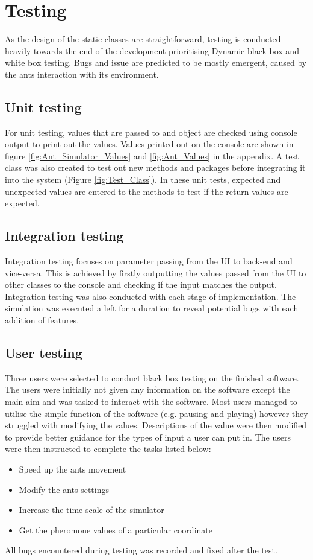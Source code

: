 \documentclass[a4paper, oneside, 11pt]{report}
\begin{document}
\chapter{Testing}
\label{chap:Testing}
As the design of the static classes are straightforward, testing is conducted heavily towards the end of the development prioritising Dynamic black box and white box testing. Bugs and issue are predicted to be mostly emergent, caused by the ants interaction with its environment.

\section{Unit testing}
For unit testing, values that are passed to and object are checked using console output to print out the values. Values printed out on the console are shown in figure \ref{fig:Ant_Simulator_Values} and \ref{fig:Ant_Values} in the appendix. A test class was also created to test out  new methods and packages before integrating it into the system (Figure \ref{fig:Test_Class}). In these unit tests, expected and unexpected values are entered to the methods to test if the return values are expected.

\section{Integration testing}
Integration testing focuses on parameter passing from the UI to back-end and vice-versa. This is achieved by firstly outputting the values passed from the UI to other classes to the console and checking if the input matches the output. Integration testing was also conducted with each stage of implementation. The simulation was executed a left for a duration to reveal potential bugs with each addition of features. 

\section{User testing}
Three users were selected to conduct black box testing on the finished software. The users were initially not given any information on the software except the main aim and was tasked to interact with the software. Most users managed to utilise the simple function of the software (e.g. pausing and playing) however they struggled with modifying the values. Descriptions of the value were then modified to provide better guidance for the types of input a user can put in. The users were then instructed to complete the tasks listed below:
\begin{itemize}
	\item Speed up the ants movement
	\item Modify the ants settings
	\item Increase the time scale of the simulator
	\item Get the pheromone values of a particular coordinate
\end{itemize} 
All bugs encountered during testing was recorded and fixed after the test.
\end{document}
